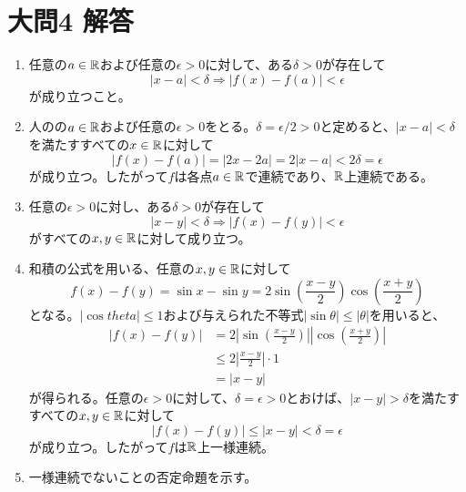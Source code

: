 \documentclass[dvipdfmx]{jsreport}
\begin{document}
\section{大問4 解答}
\begin{souanswer} %
\begin{enumerate}
    \item 任意の$a\in \mathbb{R}$および任意の$\epsilon> 0$に対して、ある$\delta > 0$が存在して
\begin{equation*}
    |x- a|< \delta\Rightarrow |f(x)- f(a)|< \epsilon
\end{equation*}
    が成り立つこと。
    \item 人のの$a\in \mathbb{R}$および任意の$\epsilon> 0$をとる。$\delta= \epsilon/2> 0$と定めると、$|x- a|< \delta$を満たすすべての$x\in \mathbb{R}$に対して
\begin{equation*}
    |f(x)- f(a)|= |2x- 2a|= 2|x- a|< 2\delta= \epsilon
\end{equation*}
    が成り立つ。したがって$f$は各点$a\in \mathbb{R}$で連続であり、$\mathbb{R}$上連続である。
    \item 任意の$\epsilon> 0$に対し、ある$\delta> 0$が存在して
\begin{equation*}
    |x- y|< \delta\Rightarrow |f(x)- f(y)|< \epsilon
\end{equation*}
    がすべての$x, y\in \mathbb{R}$に対して成り立つ。
    \item 和積の公式を用いる、任意の$x, y\in \mathbb{R}$に対して
\begin{equation*}
    f(x)- f(y)= \sin{x}- \sin{y}= 2\sin{\left(\frac{x- y}{2}\right)}\cos{\left(\frac{x+ y}{2}\right)}
\end{equation*}
    となる。$|\cos{theta}|\le 1$および与えられた不等式$|\sin{\theta}|\le |\theta|$を用いると、
\begin{align*}
    |f(x)- f(y)|
    &= 2\left|\sin{\left(\frac{x- y}{2}\right)}\right|\left|\cos{\left(\frac{x+ y}{2}\right)}\right|\\
    &\le 2\left|\frac{x- y}{2}\right|\cdot 1\\
    &= |x- y|
\end{align*}
    が得られる。任意の$\epsilon> 0$に対して、$\delta= \epsilon> 0$とおけば、$|x- y|> \delta$を満たすすべての$x, y\in \mathbb{R}$に対して
\begin{equation*}
    |f(x)- f(y)|\le |x- y|< \delta= \epsilon
\end{equation*}
    が成り立つ。したがって$f$は$\mathbb{R}$上一様連続。
    \item 一様連続でないことの否定命題を示す。
\begin{tcolorbox}

\end{tcolorbox}
\end{enumerate}
\end{souanswer}
\end{document}
